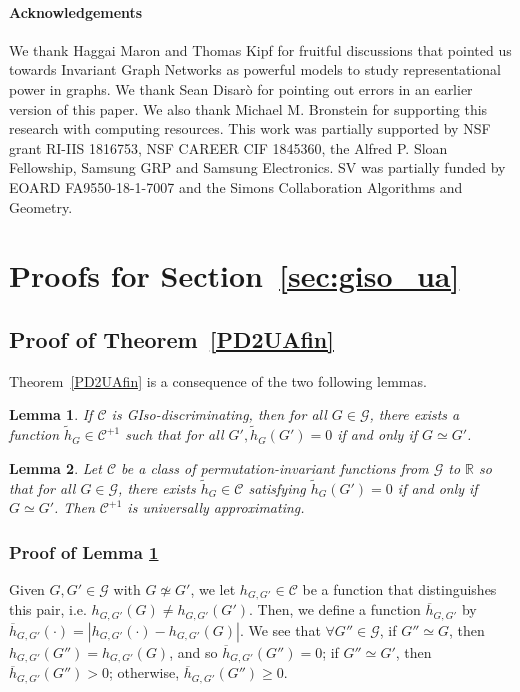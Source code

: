\documentclass{article}
\newtheorem{lemma}{Lemma}
\def\Gfun{\mathcal{G}}
\begin{document}
\paragraph{Acknowledgements} We thank Haggai Maron and Thomas Kipf for fruitful discussions that pointed us towards Invariant Graph Networks as powerful models to study representational power in graphs. We thank Sean Disar\`{o} for pointing out errors in an earlier version of this paper.
We also thank Michael M. Bronstein for supporting this research with computing resources.
This work was partially supported by NSF grant RI-IIS 1816753, NSF CAREER CIF 1845360, the Alfred P. Sloan Fellowship, Samsung GRP and Samsung Electronics.
SV was partially funded by EOARD FA9550-18-1-7007 and the Simons Collaboration Algorithms and Geometry.

\newpage







\newpage
\appendix
\section{Proofs for Section~\ref{sec:giso_ua}}
\label{app.universal}
\subsection{Proof of Theorem~\ref{PD2UAfin}}
\label{app:pf_thm2}
Theorem~\ref{PD2UAfin} is a consequence of the two following lemmas.
\begin{lemma}
\label{lemma1}
    If $\mathcal{C}$ is GIso-discriminating, then for all $G \in \Gfun$, there exists a function $\tilde{h}_G \in \mathcal{C}^{+1}$ such that for all $G', \tilde{h}_G(G') = 0$ if and only if $G \simeq G'$.
\end{lemma}

\begin{lemma}
\label{lemma2}
Let $\mathcal C$ be a class of permutation-invariant functions from $\Gfun$ to $\mathbb R$ so that for all $G \in \Gfun$, there exists $\tilde{h}_G \in \mathcal{C}$ satisfying $\tilde{h}_G(G') = 0$ if and only if $G \simeq G'$. 
Then  $\mathcal{C}^{+1}$ is universally approximating.
\end{lemma}

\subsubsection{Proof of Lemma \ref{lemma1}}
Given $G, G' \in \Gfun$ with $G \not\simeq G'$, we let $h_{G, G'} \in \mathcal{C}$ be a function that distinguishes this pair, i.e. $h_{G, G'} (G) \neq h_{G, G'} (G')$. Then, we define a function $\overline{h}_{G, G'}$ by $ \overline{h}_{G, G'}(\cdot) = |h_{G, G'}(\cdot) - h_{G, G'}(G)| $.
We see that $\forall G'' \in \Gfun$, if $G'' \simeq G$, then $h_{G, G'}(G'') = h_{G, G'}(G)$, and so $\overline{h}_{G, G'}(G'') = 0$; if $G'' \simeq G'$, then $\overline{h}_{G, G'}(G'') > 0$; otherwise, $\overline{h}_{G, G'}(G'') \geq 0$.
\end{document}
